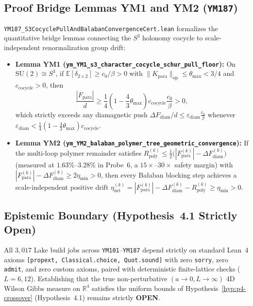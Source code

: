 \documentclass[11pt,a4paper]{article}
\newcommand{\R}{\mathbb{R}}
\newcommand{\SU}{\mathrm{SU}}
\begin{document}
\subsection{Proof Bridge Lemmas YM1 and YM2 (\texttt{YM187})}
\texttt{YM187\_\allowbreak S3CocyclePullAndBalabanConvergenceCert.lean} formalizes the quantitative bridge lemmas connecting the $S^3$ holonomy cocycle to scale-independent renormalization group drift:
\begin{itemize}
\item \textbf{Lemma YM1 (\texttt{ym\_\allowbreak YM1\_\allowbreak s3\_\allowbreak character\_\allowbreak cocycle\_\allowbreak schur\_\allowbreak pull\_\allowbreak floor}):} On $\SU(2) \cong S^3$, if $\mathbb{E}[\delta_{2\times 2}] \ge c_0/\beta > 0$ with $\|K_{\mathrm{para}}\|_{\mathrm{op}} \le \theta_{\max} < 3/4$ and $c_{\mathrm{cocycle}} > 0$, then
\[
\frac{|F_{\mathrm{para}}|}{d} \ge \frac{1}{4}\!\left(1 - \frac{4}{3}\theta_{\max}\right) c_{\mathrm{cocycle}}\frac{c_0}{\beta} > 0,
\]
which strictly exceeds any diamagnetic push $\Delta F_{\mathrm{diam}}/d \le \varepsilon_{\mathrm{diam}}\frac{c_0}{\beta}$ whenever $\varepsilon_{\mathrm{diam}} < \frac{1}{4}(1 - \frac{4}{3}\theta_{\max})c_{\mathrm{cocycle}}$.
\item \textbf{Lemma YM2 (\texttt{ym\_\allowbreak YM2\_\allowbreak balaban\_\allowbreak polymer\_\allowbreak tree\_\allowbreak geometric\_\allowbreak convergence}):} If the multi-loop polymer remainder satisfies $R_{\mathrm{poly}}^{(k)} \le \frac{1}{2}\bigl(|F_{\mathrm{para}}^{(k)}| - \Delta F_{\mathrm{diam}}^{(k)}\bigr)$ (measured at $1.63\%$--$3.28\%$ in Probe~6, a $15\times$--$30\times$ safety margin) with $|F_{\mathrm{para}}^{(k)}| - \Delta F_{\mathrm{diam}}^{(k)} \ge 2\eta_{\min} > 0$, then every Ba{\l}aban blocking step achieves a scale-independent positive drift $\eta_{\mathrm{net}}^{(k)} = |F_{\mathrm{para}}^{(k)}| - \Delta F_{\mathrm{diam}}^{(k)} - R_{\mathrm{poly}}^{(k)} \ge \eta_{\min} > 0$.
\end{itemize}

\subsection{Epistemic Boundary (Hypothesis~4.1 Strictly Open)}
All $3,017$ Lake build jobs across \texttt{YM101}--\texttt{YM187} depend strictly on standard Lean~4 axioms \texttt{[propext, Classical.choice, Quot.sound]} with zero \texttt{sorry}, zero \texttt{admit}, and zero custom axioms, paired with deterministic finite-lattice checks ($L = 6, 12$). Establishing that the true non-perturbative $(a \to 0, L \to \infty)$ 4D Wilson Gibbs measure on $\R^4$ satisfies the uniform bounds of Hypothesis~\ref{hyp:p4-crossover} (Hypothesis~4.1) remains strictly \textbf{OPEN}.



\end{document}
